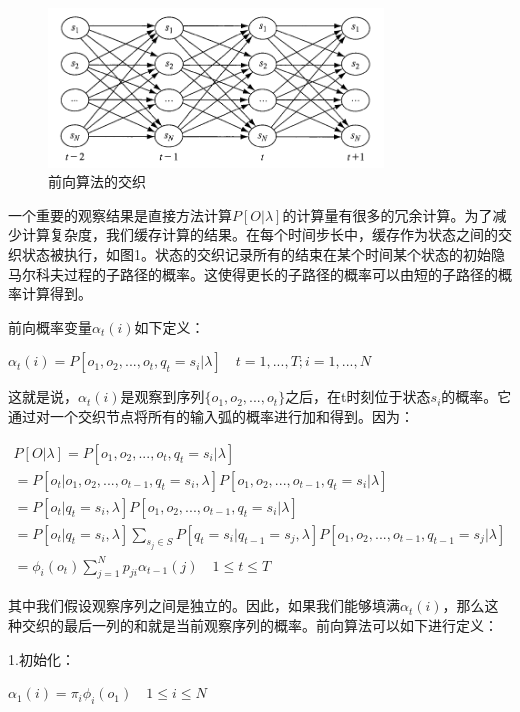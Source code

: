 \documentclass[UTF8]{ctexart}
\begin{document}
\begin{figure}[htbp]
\centering\includegraphics[width=3.5in]{f114}
\caption{前向算法的交织}\label{fig:1}
\end{figure}


一个重要的观察结果是直接方法计算$P[O|\lambda]$的计算量有很多的冗余计算。为了减少计算复杂度，我们缓存计算的结果。在每个时间步长中，缓存作为状态之间的交织状态被执行，如图1。状态的交织记录所有的结束在某个时间某个状态的初始隐马尔科夫过程的子路径的概率。这使得更长的子路径的概率可以由短的子路径的概率计算得到。

前向概率变量$\alpha_t(i)$如下定义：

\begin{center}
$
\alpha_t(i)=P[o_1,o_2,...,o_t,q_t=s_i|\lambda]\quad t=1,...,T;i=1,...,N
$
\end{center}

这就是说，$\alpha_t(i)$是观察到序列$\{o_1,o_2,...,o_t\}$之后，在t时刻位于状态$s_i$的概率。它通过对一个交织节点将所有的输入弧的概率进行加和得到。因为：

\begin{center}
$
\begin{aligned}
P[O|\lambda]=P[o_1,o_2,...,o_t,q_t=s_i|\lambda]\\
=P[o_t|o_1,o_2,...,o_{t-1},q_t=s_i,\lambda]P[o_1,o_2,...,o_{t-1},q_t=s_i|\lambda]\\
=P[o_t|q_t=s_i,\lambda]P[o_1,o_2,...,o_{t-1},q_t=s_i|\lambda]\\
=P[o_t|q_t=s_i,\lambda]\sum_{s_j\in S}P[q_t=s_i|q_{t-1}=s_j,\lambda]P[o_1,o_2,...,o_{t-1},q_{t-1}=s_j|\lambda]\\
=\phi_i(o_t)\sum_{j=1}^Np_{ji}\alpha_{t-1}(j)\quad 1\le t\le T
\end{aligned}$
\end{center}

其中我们假设观察序列之间是独立的。因此，如果我们能够填满$\alpha_t(i)$，那么这种交织的最后一列的和就是当前观察序列的概率。前向算法可以如下进行定义：

1.初始化：

\begin{center}
$
\alpha_1(i)= \pi_i\phi_i(o_1)\quad1\le i \le N
$
\end{center}
\end{document}
